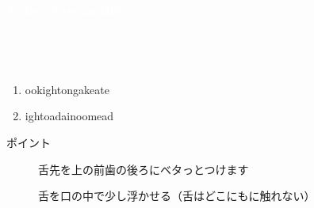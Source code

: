 \documentclass[aspectratio=169,xcolor={dvipsnames,table}]{beamer}
\begin{document}
\begin{frame}
\centering
  \textcolor{white}{\Huge\bfseries Today's Pronunciation}\pause

 \vspace{30pt}

  \textcolor{white}{\Huge\bfseries {}, }

\hypertarget{today}{}
\end{frame}
\begin{frame}[plain]{\,\,\,}

\large

\begin{enumerate}
 \item  {}\hspace{20pt}ook\hspace{1\zw}ight\hspace{1\zw}ong\hspace{1\zw}ake\hspace{1\zw}ate
 \item  {}\hspace{20pt}ight\hspace{1\zw}oad\hspace{1\zw}ain\hspace{1\zw}oom\hspace{1\zw}ead
\end{enumerate}

\vspace*{20pt}

\normalsize
ポイント

\begin{description}
 \item[] 舌先を上の前歯の後ろにベタっとつけます
 \item[] 舌を口の中で少し浮かせる（舌はどこにもに触れない）
\end{description}
\hfill{}
\end{frame}
\end{document}
